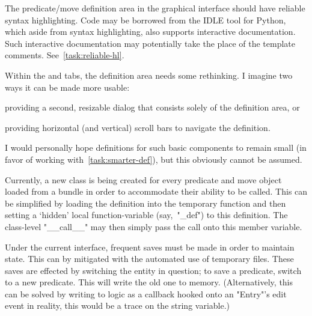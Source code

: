 \begin{task}
  \label{task:gui-syntax-highlighting}
  The predicate\slash move definition area in the graphical interface
    should have reliable syntax highlighting.
  Code may be borrowed from the IDLE tool for Python,
    which aside from syntax highlighting, also supports interactive documentation.
  Such interactive documentation may potentially take the place of the template comments.
  See~\autoref{task:reliable-hl}.
\end{task}

\begin{task}
  \label{task:gui-definition-wrapping}
  Within the  and  tabs,
    the definition area needs some rethinking.
  I imagine two ways it can be made more usable:
  \begin{itemize*}
  \item providing a second, resizable dialog that consists solely of the definition area, or
  \item providing horizontal (and vertical) scroll bars to navigate the definition.
  \end{itemize*}
  I would personally hope definitions for such basic components to remain small
    (in favor of working with~\autoref{task:smarter-def}),
    but this obviously cannot be assumed.
\end{task}

\begin{task}
  \label{task:smarter-def}
  Currently, a new class is being created for every predicate and move
  object loaded from a bundle in order to accommodate their ability to
  be called.  This can be simplified by loading the definition into
  the temporary function and then setting a \enquote*{hidden} local
  function-variable (say,~"_def") to this definition.  The
  class-level "__call__" may then simply pass the call onto this
  member variable.
\end{task}

\begin{task}
  \label{task:temp-files}
  Under the current interface, frequent saves must be made in order to
  maintain state.  This can by mitigated with the automated use of
  temporary files.  These saves are effected by switching the entity
  in question; \ie to save a predicate, switch to a new predicate.
  This will write the old one to memory.  (Alternatively, this can be
  solved by writing to logic as a callback hooked onto an "Entry"'s
  edit event \Dash in reality, this would be a trace on the string
  variable.)
\end{task}


